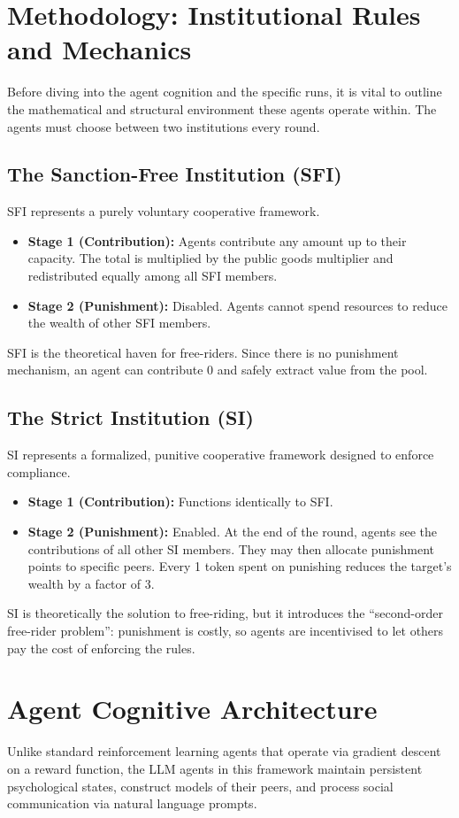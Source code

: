 \documentclass[11pt,a4paper]{article}
\begin{document}
\section{Methodology: Institutional Rules and Mechanics}

Before diving into the agent cognition and the specific runs, it is vital to outline the mathematical and structural environment these agents operate within. The agents must choose between two institutions every round.

\subsection{The Sanction-Free Institution (SFI)}
SFI represents a purely voluntary cooperative framework. 
\begin{itemize}
    \item \textbf{Stage 1 (Contribution):} Agents contribute any amount up to their capacity. The total is multiplied by the public goods multiplier and redistributed equally among all SFI members.
    \item \textbf{Stage 2 (Punishment):} Disabled. Agents cannot spend resources to reduce the wealth of other SFI members.
\end{itemize}
SFI is the theoretical haven for free-riders. Since there is no punishment mechanism, an agent can contribute 0 and safely extract value from the pool.

\subsection{The Strict Institution (SI)}
SI represents a formalized, punitive cooperative framework designed to enforce compliance.
\begin{itemize}
    \item \textbf{Stage 1 (Contribution):} Functions identically to SFI.
    \item \textbf{Stage 2 (Punishment):} Enabled. At the end of the round, agents see the contributions of all other SI members. They may then allocate punishment points to specific peers. Every 1 token spent on punishing reduces the target's wealth by a factor of 3.
\end{itemize}
SI is theoretically the solution to free-riding, but it introduces the ``second-order free-rider problem'': punishment is costly, so agents are incentivised to let others pay the cost of enforcing the rules.

\section{Agent Cognitive Architecture}
Unlike standard reinforcement learning agents that operate via gradient descent on a reward function, the LLM agents in this framework maintain persistent psychological states, construct models of their peers, and process social communication via natural language prompts.
\end{document}
